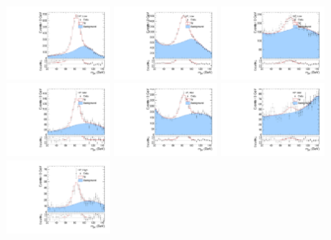 \begin{figure}[htbp]
  \centering
  \includegraphics[width=0.3\textwidth]{fig/Vtag/PostFit__MJJ__allC_allL_HP_Low.pdf}
  \includegraphics[width=0.3\textwidth]{fig/Vtag/PostFit__MJJ__allC_allL_LP_Low.pdf}
  \includegraphics[width=0.3\textwidth]{fig/Vtag/PostFit__MJJ__allC_allL_NP_Low.pdf}\\
  \includegraphics[width=0.3\textwidth]{fig/Vtag/PostFit__MJJ__allC_allL_HP_Mid.pdf}
  \includegraphics[width=0.3\textwidth]{fig/Vtag/PostFit__MJJ__allC_allL_LP_Mid.pdf}
  \includegraphics[width=0.3\textwidth]{fig/Vtag/PostFit__MJJ__allC_allL_NP_Mid.pdf}\\
  \includegraphics[width=0.3\textwidth]{fig/Vtag/PostFit__MJJ__allC_allL_HP_High.pdf}

\end{figure}
